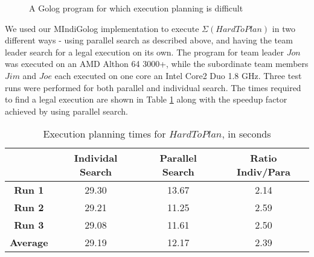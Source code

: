 %
\begin{figure}
\begin{centering}
\framebox{%
\parbox[t][1\totalheight]{0.85\columnwidth}{%
\begin{gather*}
\mathbf{proc}\, HardToPlan()\\
\left[AcquireType(Joe,Carrot)\,;\right.\\
AcquireType(Jon,Sugar)\,;\\
AcquireType(Jim,Lettuce)\,;\\
AcquireType(Joe,Flour)\,;\\
AcquireType(Jon,Flour)\,;\\
HasObject(Jon,Carrot3)?\,;\\
HasObject(Joe,Flour5)?\,;\\
\left.\, HasObject(Jon,Sugar4)?\right]\,\,\mathbf{end}\\
\\\mathbf{proc}\, AcquireType(Agt,Type)\\
\pi(obj,\, IsType(obj,Type)?\,;\\
\left.\, acquire(Agt,obj)))\right]\,\,\mathbf{end}\end{gather*}
}} 
\par\end{centering}

\caption{A Golog program for which execution planning is difficult\label{fig:MIndiGolog:HardToPlan}}

\end{figure}


We used our MIndiGolog implementation to execute $\Sigma(HardToPlan)$
in two different ways - using parallel search as described above,
and having the team leader search for a legal execution on its own.
The program for team leader $Jon$ was executed on an AMD Althon 64
3000+, while the subordinate team members $Jim$ and $Joe$ each executed
on one core an Intel Core2 Duo 1.8 GHz. Three test runs were performed
for both parallel and individual search. The times required to find
a legal execution are shown in Table \ref{tab:MIndiGolog:Execution-planning-times}
along with the speedup factor achieved by using parallel search.

%
\begin{table}
\begin{centering}
\begin{tabular}{|c|c|c|c|}
\hline 
 & \textbf{Individal Search}  & \textbf{Parallel Search}  & \textbf{Ratio Indiv/Para}\tabularnewline
\hline
\hline 
\textbf{Run 1}  & 29.30  & 13.67  & 2.14\tabularnewline
\hline 
\textbf{Run 2}  & 29.21  & 11.25  & 2.59\tabularnewline
\hline 
\textbf{Run 3}  & 29.08  & 11.61  & 2.50\tabularnewline
\hline
\hline 
\textbf{Average}  & 29.19  & 12.17  & 2.39\tabularnewline
\hline
\end{tabular}
\par\end{centering}

\caption{Execution planning times for $HardToPlan$, in seconds\label{tab:MIndiGolog:Execution-planning-times}}

\end{table}


